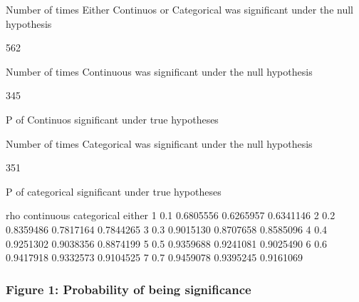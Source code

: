 \documentclass{article}
\begin{document}
\begin{Schunk}
\begin{Soutput}
Number of times Either Continuos or Categorical was significant under the null hypothesis
\end{Soutput}
\begin{Soutput}
[1] 562
\end{Soutput}
\begin{Soutput}
Number of times Continuous was significant under the null hypothesis
\end{Soutput}
\begin{Soutput}
[1] 345
\end{Soutput}
\begin{Soutput}
P of  Continuos  significant under true hypotheses
\end{Soutput}
\begin{Soutput}
Number of times Categorical was significant under the null hypothesis
\end{Soutput}
\begin{Soutput}
[1] 351
\end{Soutput}
\begin{Soutput}
P of  categorical  significant under true hypotheses
\end{Soutput}
\begin{Soutput}
  rho continuous categorical    either
1 0.1  0.6805556   0.6265957 0.6341146
2 0.2  0.8359486   0.7817164 0.7844265
3 0.3  0.9015130   0.8707658 0.8585096
4 0.4  0.9251302   0.9038356 0.8874199
5 0.5  0.9359688   0.9241081 0.9025490
6 0.6  0.9417918   0.9332573 0.9104525
7 0.7  0.9459078   0.9395245 0.9161069
\end{Soutput}
\end{Schunk}


\subsubsection*{Figure 1: Probability of being significance}
\end{document}
